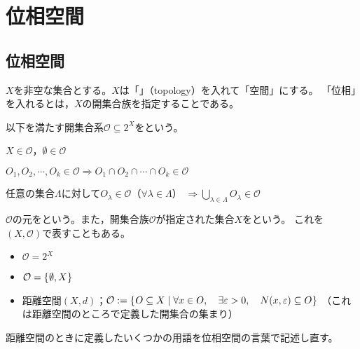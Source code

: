 \documentclass[uplatex]{jsarticle}
\renewcommand{\thepart}{\arabic{part}}
\begin{document}
  \fi
\renewcommand{\thesubsection}{\thepart.\arabic{section}.\arabic{subsection}}
  
\section{位相空間}
\subsection{位相空間}

$X$を非空な集合とする。$X$は「」（topology）を入れて「空間」にする。
「位相」を入れるとは，$X$の開集合族を指定することである。

\begin{teigi}[位相]
  以下を満たす開集合系$\mathcal{O} \subseteq 2^{X}$をという。

   $X \in \mathcal{O}$，$\emptyset \in \mathcal{O}$

   $O_{1}, O_{2}, \cdots, O_{k} \in \mathcal{O} \Longrightarrow O_{1} \cap O_{2} \cap \cdots \cap O_{k} \in \mathcal{O}$

   任意の集合$\Lambda$に対して$O_{\lambda} \in \mathcal{O}$（$\forall \lambda \in \Lambda$） ${\displaystyle \Longrightarrow \bigcup_{\lambda \in \Lambda} O_{\lambda} \in \mathcal{O}}$

  $\mathcal{O}$の元をという。また，開集合族$\mathcal{O}$が指定された集合$X$をという。
  これを$(X,\mathcal{O})$で表すこともある。
\end{teigi}

\begin{rei}
  \begin{itemize}
    \item {} $\mathcal{O} = 2^{X}$
    \item {} $\mathcal{O} = \Set{\hspace{-1.8pt} \emptyset, X \hspace{-1.8pt}}$
    \item 距離空間$(X,d)$；$\mathcal{O} := \Set{\hspace{-1.8pt} O \subseteq X | \forall x \in O, \quad \exists \varepsilon > 0, \quad N(x, \varepsilon) \subseteq O \hspace{-1.8pt}}$
    （これは距離空間のところで定義した開集合の集まり）
  \end{itemize}
\end{rei}

距離空間のときに定義したいくつかの用語を位相空間の言葉で記述し直す。
\end{document}
